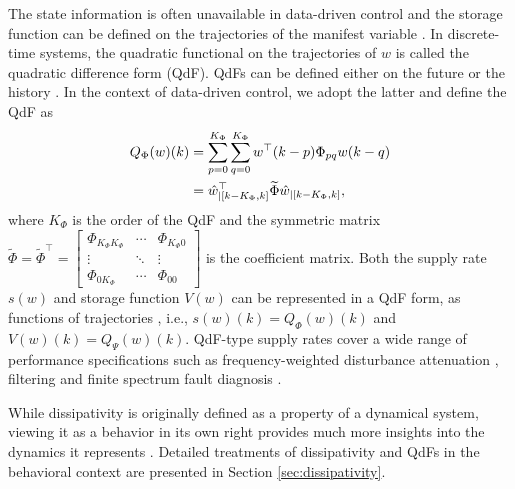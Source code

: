 \documentclass[11pt,print,draftcls,onecolumn,romanappendices]{ieeecolor}
\newcommand{\revise}[1]{{\color{black} #1}}
\newcommand{\bint}[1]{{|[#1]}}
\begin{document}
\revise{The state information is often unavailable in data-driven control and the storage function can be defined on the trajectories of the manifest variable \cite{Willems:1998}.} %
In discrete-time systems, the quadratic functional on the trajectories of $w$ is called the quadratic difference form (QdF). QdFs can be defined either on the future \cite{Kojima:2005} or the history \cite{Wang:2019}. In the context of data-driven control, we adopt the latter and define the QdF as
\begin{equation}
	\begin{split}
		Q_{\Phi}(w)\revise{(k)}&=\sum_{p=0}^{K_\Phi}\sum_{q=0}^{K_\Phi}w^\top\revise{(k-p)}\Phi_{pq}w\revise{(k-q)}\\
		&=\hat{w}_\bint{k-K_\Phi,k}^\top \widetilde{\Phi}\hat{w}_\bint{k-K_\Phi,k},
	\end{split}
\end{equation}
where $K_\Phi$ is the order of the QdF and the symmetric matrix $\widetilde{\Phi}=\widetilde{\Phi}^\top=\begin{bmatrix}
	\Phi_{K_\Phi K_\Phi} & \cdots & \Phi_{K_\Phi0}\\
	\vdots & \ddots & \vdots\\
	\Phi_{0K_\Phi} & \cdots & \Phi_{00}
\end{bmatrix}$ is the coefficient matrix. \revise{Both the supply rate $s(w)$ and storage function $V(w)$ can be represented in a QdF form, as functions of trajectories \cite{Willems:1998,Willems:2002,Trentelman:2002,Kojima:2005,Wang:2019}, i.e.,  $s(w)(k)=Q_{\Phi}(w)(k)$ and $V(w)(k)=Q_\Psi(w)(k)$.} QdF-type supply rates cover a wide range of performance specifications such as frequency-weighted disturbance attenuation \cite{Tippett:2013,Tippett:2014,Yan:2019}, filtering \cite{Trentelman:2002} and finite spectrum fault diagnosis \cite{Liu:2005,Li:2020}.

While dissipativity is originally defined as a property of a dynamical system, viewing it as a behavior in its own right provides much more insights into the dynamics it represents \cite{Willems:2007a}. Detailed treatments of dissipativity and QdFs in the behavioral context are presented in Section \ref{sec:dissipativity}.
\end{document}
